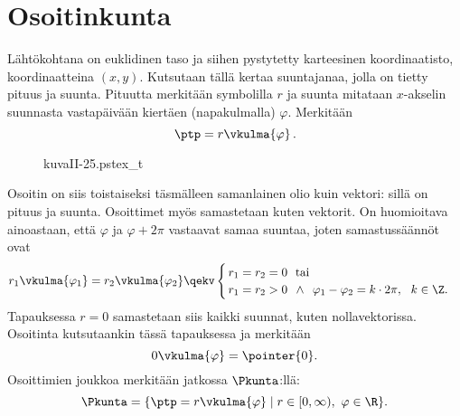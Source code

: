 \section{Osoitinkunta} \label{osoitinkunta}
\alku
{}

Lähtökohtana on euklidinen taso ja siihen pystytetty karteesinen koordinaatisto,
koordinaatteina $(x,y)$. Kutsutaan tällä kertaa  suuntajanaa, jolla on 
tietty pituus ja suunta. Pituutta merkitään symbolilla $r$ ja suunta mitataan $x$-akselin
suunnasta vastapäivään kiertäen
%
 (napakulmalla) $\varphi$. Merkitään
\[
\ptp = r \vkulma{\varphi}\,.
\]
\begin{figure}[H]
\begin{center}
{kuvaII-25.pstex_t}
\end{center}
\end{figure}
Osoitin on siis toistaiseksi täsmälleen samanlainen olio kuin vektori: sillä on pituus ja 
suunta. Osoittimet myös samastetaan kuten vektorit. On huomioitava ainoastaan, että
$\varphi$ ja $\varphi+2\pi$ vastaavat samaa suuntaa, joten samastussäännöt ovat
% 
\[
r_1\vkulma{\varphi_1}=r_2\vkulma{\varphi_2} \qekv
\begin{cases}
\,r_1=r_2=0\ \ \text{tai} \\ 
\,r_1=r_2>0\,\ \wedge\,\ \varphi_1-\varphi_2=k \cdot 2\pi,\ \ k\in\Z.
\end{cases}
\]
Tapauksessa $r=0$ samastetaan siis kaikki suunnat, kuten nollavektorissa. Osoitinta
kutsutaankin tässä tapauksessa
%
 ja merkitään
\[
0 \vkulma{\varphi} = \pointer{0}.
\]
Osoittimien joukkoa merkitään jatkossa $\Pkunta$:llä:
\[
\Pkunta=\{\ptp = r\vkulma{\varphi} \mid r\in[0,\infty),\ \varphi\in\R\}.
\]

